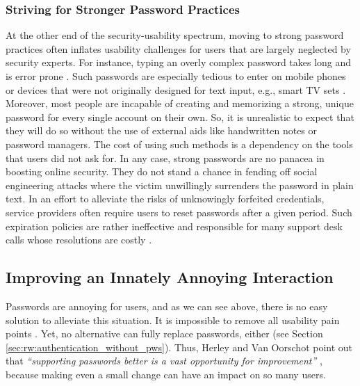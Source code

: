 \subsubsection{Striving for Stronger Password Practices}
At the other end of the security-usability spectrum, moving to strong password practices often inflates usability challenges for users that are largely neglected by security experts. For instance, typing an overly complex password takes long and is error prone \cite{Shay2014CanLongPasswordsBeSecureAndUsable}. Such passwords are especially tedious to enter on mobile phones or devices that were not originally designed for text input, e.g., smart TV sets \cite{Melicher2016UsabilityMobileTextPasswords}. Moreover, most people are incapable of creating and memorizing a strong, unique password for every single account on their own. So, it is unrealistic to expect that they will do so without the use of external aids like handwritten notes or password managers. The cost of using such methods is a dependency on the tools that users did not ask for. In any case, strong passwords are no panacea in boosting online security. They do not stand a chance in fending off social engineering attacks where the victim unwillingly surrenders the password in plain text. In an effort to alleviate the risks of unknowingly forfeited credentials, service providers often require users to reset passwords after a given period. Such expiration policies are rather ineffective \cite{Chiasson2015QuantifyingExpiration} and responsible for many support desk calls whose resolutions are costly \cite{Adams1999UsersEnemy, Sasse2005UsableSecurityPosition}. 

\subsection{Improving an Innately Annoying Interaction}
Passwords are annoying for users, and as we can see above, there is no easy solution to alleviate this situation. It is impossible to remove all usability pain points \cite{Bonneau2012ReplacePasswords}. Yet, no alternative can fully replace passwords, either (see Section \ref{sec:rw:authentication_without_pws}). Thus, Herley and Van Oorschot point out that \textit{``supporting passwords better is a vast opportunity for improvement''} \cite{Herley2012PersistenceOfPasswords}, because making even a small change can have an impact on so many users. 

